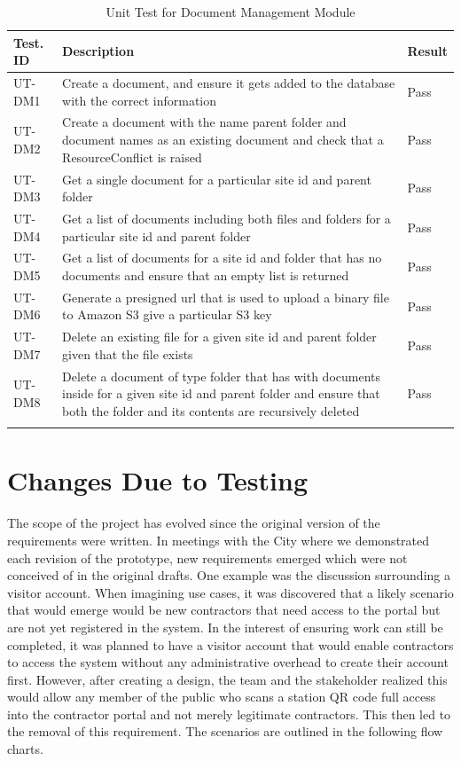 \documentclass[12pt, titlepage]{article}
\begin{document}
\begin{longtable}{|m{2cm}|m{10cm}|m{1.4cm}|}
  \hline
  \textbf{Test. ID} & \textbf{Description} & \textbf{Result} \\ \hline
  UT-DM1 & Create a document, and ensure it gets added to the
  database with the correct information & Pass\\ \hline
  UT-DM2 & Create a document with the name parent folder and document names as
  an existing document and check that a ResourceConflict is raised &
  Pass\\ \hline
  UT-DM3 & Get a single document for a particular site id and parent
  folder & Pass\\ \hline
  UT-DM4 & Get a list of documents including both files and folders for a
  particular site id and parent folder & Pass\\ \hline
  UT-DM5 & Get a list of documents for a site id and folder that has no
  documents and ensure that an empty list is returned & Pass\\ \hline
  UT-DM6 & Generate a presigned url that is used to upload a binary file to
  Amazon S3 give a particular S3 key & Pass\\ \hline
  UT-DM7 & Delete an existing file for a given site id and parent folder given
  that the file exists & Pass\\ \hline
  UT-DM8 & Delete a document of type folder that has with documents
  inside for a given site id
  and parent folder and ensure that both the folder and its contents are
  recursively deleted & Pass\\ \hline
  \caption{Unit Test for Document Management Module}
\end{longtable}

\section{Changes Due to Testing}

The scope of the project has evolved since the original version of the requirements were written.
In meetings with the City where we demonstrated each revision of the prototype, new requirements emerged which were not conceived
of in the original drafts. One example was the discussion surrounding a visitor account. When imagining use cases, it was discovered
that a likely scenario that would emerge would be new contractors that need access to the portal but are not yet registered in the 
system. In the interest of ensuring work can still be completed, it was planned to have a visitor account that would enable contractors
to access the system without any administrative overhead to create their account first. However, after creating a design, the team and
the stakeholder realized this would allow any member of the public who scans a station QR code full access into the contractor portal and
not merely legitimate contractors. This then led to the removal of this requirement. The scenarios are outlined in the following flow charts.
\newpage
\end{document}
